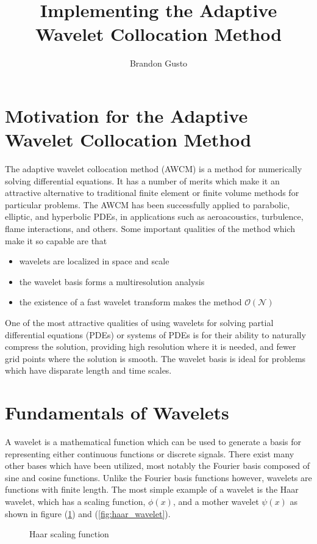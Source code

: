 \documentclass[11pt]{article}
\begin{document}
\title{Implementing the Adaptive Wavelet Collocation Method}
\author{Brandon Gusto \\}

\maketitle


\section{Motivation for the Adaptive Wavelet Collocation Method}
The adaptive wavelet collocation method (AWCM) is a method for numerically solving differential equations.
It has a number of merits which make it an attractive alternative to traditional finite element or finite volume 
methods for particular problems. The AWCM has been successfully applied to parabolic, elliptic, and 
hyperbolic PDEs, in applications such as aeroacoustics, turbulence, flame interactions, and others. 
Some important qualities of the method which make it so capable are that
\begin{itemize}
    \item wavelets are localized in space and scale
    \item the wavelet basis forms a multiresolution analysis
    \item the existence of a fast wavelet transform makes the method $\mathcal{O}(\mathcal{N})$
\end{itemize} 
One of the most attractive qualities of using wavelets for solving partial differential equations (PDEs) or systems of PDEs is for their
ability to naturally compress the solution, providing high resolution where it is needed, and fewer grid points where the 
solution is smooth. The wavelet basis is ideal for problems which have 
disparate length and time scales.


\section{Fundamentals of Wavelets}
A wavelet is a mathematical function which can be used to generate a basis for representing either continuous functions or 
discrete signals. There exist many other bases which have been utilized, most notably the Fourier
basis composed of sine and cosine functions.
Unlike the Fourier basis functions however, wavelets are functions with finite length. The most simple example of a wavelet
is the Haar wavelet, which has a scaling function, $\phi(x)$, and a mother wavelet $\psi(x)$ as shown in 
figure (\ref{fig:haar_scaling}) and (\ref{fig:haar_wavelet}).
\begin{figure}[H]
	\centering
	
	\caption{Haar scaling function}
	\label{fig:haar_scaling}
\end{figure}
\end{document}

